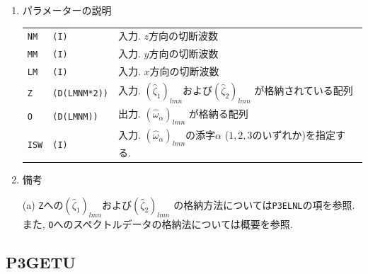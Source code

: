 \documentclass[a4j,fleqn]{jarticle}
\begin{document}
\begin{enumerate}
\item パラメーターの説明

\begin{tabular}{lll}
{\tt NM} & {\tt (I)} & 入力. $z$方向の切断波数\\
{\tt MM} & {\tt (I)} & 入力. $y$方向の切断波数\\
{\tt LM} & {\tt (I)} & 入力. $x$方向の切断波数\\
{\tt Z} & {\tt (D(LMNM*2))} &
 入力. $(\hat{\zeta}_1)_{lmn}$および$(\hat{\zeta}_2)_{lmn}$
  が格納されている配列\\
{\tt O} & {\tt (D(LMNM))} &
 出力. $(\hat{\omega}_{\alpha})_{lmn}$
  が格納る配列\\
{\tt ISW} & {\tt (I)} & 入力. $(\hat{\omega}_{\alpha})_{lmn}$の添字$\alpha$
($1,2,3$のいずれか)を指定する.
\end{tabular}

\item 備考

(a) {\tt Z}への$(\hat{\zeta}_1)_{lmn}$および$(\hat{\zeta}_2)_{lmn}$
の格納方法については{\tt P3ELNL}の項を参照.
また, {\tt O}へのスペクトルデータの格納法については概要を参照.

\end{enumerate}


\subsection{P3GETU}
\end{document}
